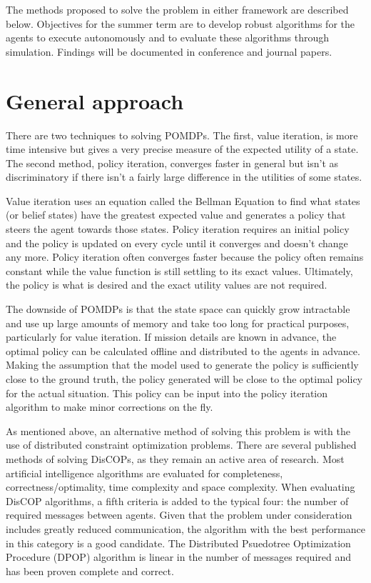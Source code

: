 \documentclass{article}
\begin{document}
The methods proposed to solve the problem in either framework are described below. Objectives for the summer term are to develop robust algorithms for the agents to execute autonomously and to evaluate these algorithms through simulation. Findings will be documented in conference and journal papers.\\

\section{General approach}
There are two techniques to solving POMDPs. The first, value iteration, is more time intensive but gives a very precise measure of the expected utility of a state. The second method, policy iteration, converges faster in general but isn't as discriminatory if there isn't a fairly large difference in the utilities of some states.

Value iteration uses an equation called the Bellman Equation to find what states (or belief states) have the greatest expected value and generates a policy that steers the agent towards those states. Policy iteration requires an initial policy and the policy is updated on every cycle until it converges and doesn't change any more. Policy iteration often converges faster because the policy often remains constant while the value function is still settling to its exact values. Ultimately, the policy is what is desired and the exact utility values are not required.

The downside of POMDPs is that the state space can quickly grow intractable and use up large amounts of memory and take too long for practical purposes, particularly for value iteration. If mission details are known in advance, the optimal policy can be calculated offline and distributed to the agents in advance. Making the assumption that the model used to generate the policy is sufficiently close to the ground truth, the policy generated will be close to the optimal policy for the actual situation. This policy can be input into the policy iteration algorithm to make minor corrections on the fly.

As mentioned above, an alternative method of solving this problem is with the use of distributed constraint optimization problems. There are several published methods of solving DisCOPs, as they remain an active area of research. Most artificial intelligence algorithms are evaluated for completeness, correctness/optimality, time complexity and space complexity. When evaluating DisCOP algorithms, a fifth criteria is added to the typical four: the number of required messages between agents. Given that the problem under consideration includes greatly reduced communication, the algorithm with the best performance in this category is a good candidate. The Distributed Psuedotree Optimization Procedure (DPOP) algorithm is linear in the number of messages required and has been proven complete and correct.\\
\end{document}

